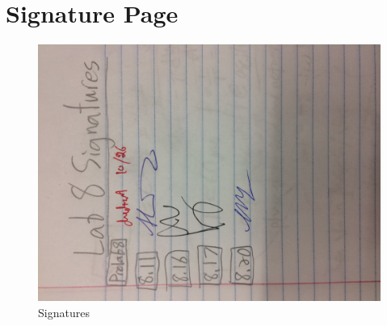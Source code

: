 \documentclass{article}
\begin{document}
\section{Signature Page}
\begin{figure}[H]
    \centering
    \includegraphics[scale = 0.2,angle = -90]{sig.JPG}
    \caption{Signatures}
    \label{fig:my_label}
\end{figure}



{}

\end{document}

